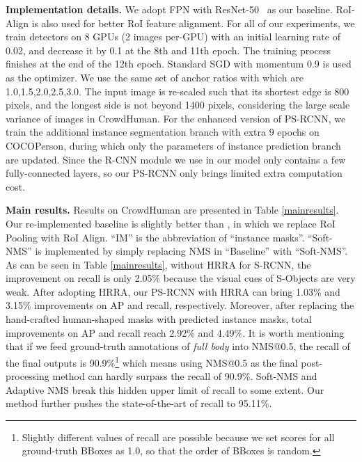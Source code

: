 \documentclass{article}
\begin{document}
\noindent \textbf{Implementation details.} We adopt FPN with ResNet-50~\cite{he2016deep} as our baseline. RoI-Align is also used for better RoI feature alignment. For all of our experiments, we train detectors on 8 GPUs (2 images per-GPU) with an initial learning rate of 0.02, and decrease it by 0.1 at the 8th and 11th epoch. The training process finishes at the end of the 12th epoch. Standard SGD with momentum 0.9 is used as the optimizer. We use the same set of anchor ratios with \cite{CrowdHuman} which are {1.0,1.5,2.0,2.5,3.0}. The input image is re-scaled such that its shortest edge is 800 pixels, and the longest side is not beyond 1400 pixels, considering the large scale variance of images in CrowdHuman. For the enhanced version of PS-RCNN, we train the additional instance segmentation branch with extra 9 epochs on COCOPerson, during which only the parameters of instance prediction branch are updated. Since the R-CNN module we use in our model only contains a few fully-connected layers, so our PS-RCNN only brings limited extra computation cost.

\noindent \textbf{Main results.} Results on CrowdHuman are presented in Table \ref{mainresults}. Our re-implemented baseline is slightly better than \cite{CrowdHuman}, in which we replace RoI Pooling with RoI Align. ``IM'' is the abbreviation of ``instance masks''. ``Soft-NMS'' is implemented by simply replacing NMS in ``Baseline'' with ``Soft-NMS''. As can be seen in Table \ref{mainresults}, without HRRA for S-RCNN, the improvement on recall is only 2.05\% because the visual cues of S-Objects are very weak. After adopting HRRA, our PS-RCNN with HRRA can bring 1.03\% and 3.15\% improvements on AP and recall, respectively. Moreover, after replacing the hand-crafted human-shaped masks with predicted instance masks, total improvements on AP and recall reach 2.92\% and 4.49\%. It is worth mentioning that if we feed ground-truth annotations of \textit{full body} into NMS@0.5, the recall of the final outputs is 90.9\%\footnote{Slightly different values of recall are possible because we set scores for all ground-truth BBoxes as 1.0, so that the order of BBoxes is random.} which means using NMS@0.5 as the final post-processing method can hardly surpass the recall of 90.9\%. Soft-NMS and Adaptive NMS break this hidden upper limit of recall to some extent. Our method further pushes the state-of-the-art of recall to 95.11\%.
\end{document}
